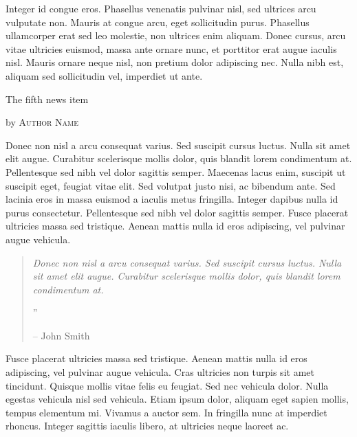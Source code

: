 \documentclass[10pt,a4paper]{article} %
\newcommand{\NewsItem}[1]{ %
    \usefont{T1}{fvs}{n}{n} %
    \vspace{24pt}\large #1\vspace{3pt} %
    \par \normalsize \normalfont}
\newcommand{\NewsAuthor}[1]{ %
    \hfill by \textsc{#1} \vspace{20pt} %
    \par \normalfont}
\begin{document}
\begin{multicols}{3}
    Integer id congue eros. Phasellus venenatis pulvinar nisl, sed ultrices arcu
    vulputate non. Mauris at congue arcu, eget sollicitudin purus. Phasellus
    ullamcorper erat sed leo molestie, non ultrices enim aliquam. Donec cursus,
    arcu vitae ultricies euismod, massa ante ornare nunc, et porttitor erat augue
    iaculis nisl. Mauris ornare neque nisl, non pretium dolor adipiscing nec. Nulla
    nibh est, aliquam sed sollicitudin vel, imperdiet ut ante.


    \NewsItem{The fifth news item}
    \NewsAuthor{Author Name}

    Donec non nisl a arcu consequat varius. Sed suscipit cursus luctus. Nulla sit
    amet elit augue. Curabitur scelerisque mollis dolor, quis blandit lorem
    condimentum at. Pellentesque sed nibh vel dolor sagittis semper. Maecenas lacus
    enim, suscipit ut suscipit eget, feugiat vitae elit. Sed volutpat justo nisi,
    ac bibendum ante. Sed lacinia eros in massa euismod a iaculis metus fringilla.
    Integer dapibus nulla id purus consectetur. Pellentesque sed nibh vel dolor
    sagittis semper. Fusce placerat ultricies massa sed tristique. Aenean mattis
    nulla id eros adipiscing, vel pulvinar augue vehicula.

    \begin{quotation} %

        \noindent\normalsize\textit{Donec non nisl a arcu consequat varius. Sed
            suscipit cursus luctus. Nulla sit amet elit augue. Curabitur scelerisque mollis
            dolor, quis blandit lorem condimentum at.}

        \hfill{\Huge''}

        \hfill-- John Smith
    \end{quotation}

    Fusce placerat ultricies massa sed tristique. Aenean mattis nulla id eros
    adipiscing, vel pulvinar augue vehicula. Cras ultricies non turpis sit amet
    tincidunt. Quisque mollis vitae felis eu feugiat. Sed nec vehicula dolor. Nulla
    egestas vehicula nisl sed vehicula. Etiam ipsum dolor, aliquam eget sapien
    mollis, tempus elementum mi. Vivamus a auctor sem. In fringilla nunc at
    imperdiet rhoncus. Integer sagittis iaculis libero, at ultricies neque laoreet
    ac.


\end{multicols}
\end{document}
